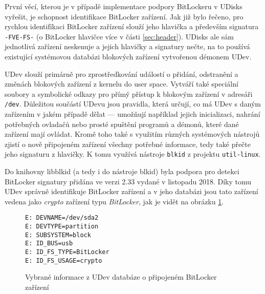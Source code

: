 \label{sec:bitlocker-identification}

První věcí, kterou je v případě implementace podpory BitLockeru v UDisks vyřešit, je schopnost identifikace BitLocker zařízení. Jak již bylo řečeno, pro rychlou identifïkaci BitLocker zařízení slouží jeho hlavička a především signatura \texttt{-FVE-FS-} (o BitLocker hlavičce více v části \ref{sec:header}). UDisks ale sám jednotlivá zařízení neskenuje a jejich hlavičky a signatury nečte, na to používá existující systémovou databázi blokových zařízení vytvořenou démonem UDev.

UDev slouží primárně pro zprostředkování událostí o přidání, odstranění a změnách blokových zařízení z kernelu do user space. Vytváří také speciální soubory a symbolické odkazy pro přímý přístup k blokovým zařízení v adresáři \texttt{/dev}. Důležitou součástí UDevu jsou pravidla, která určují, co má UDev s daným zařízením v jakém případě dělat --- umožňují například jejich inicializaci, nahrání potřebných ovladačů nebo prosté spuštění programů a démonů, které dané zařízení mají ovládat.\cite{Kenlon2018} Kromě toho také s využitím různých systémových nástrojů zjistí o nově připojeném zařízení všechny potřebné informace, tedy také přečte jeho signaturu z hlavičky. K tomu využívá nástroje \texttt{blkid} z projektu \texttt{util-linux}.

Do knihovny libblkid (a tedy i do nástroje blkid) byla podpora pro detekci BitLocker signatury přidána ve verzi 2.33 vydané v listopadu 2018\cite{Zak2018}. Díky tomu UDev správně identifikuje BitLocker zařízení a v jeho databázi jsou tato zařízení vedena jako \emph{crypto} zařízení typu \emph{BitLocker}, jak je vidět na obrázku \ref{fig:udev-bitlocker}.

\begin{figure}[h]
		\centering
		\captionsetup{width=0.65\linewidth}
\begin{center}
\centering
\begin{lstlisting}[frame=none, basicstyle=\ttfamily\small, columns=fullflexible, keepspaces=true, xleftmargin=.35\textwidth, xrightmargin=.35\textwidth]
E: DEVNAME=/dev/sda2
E: DEVTYPE=partition
E: SUBSYSTEM=block
E: ID_BUS=usb
E: ID_FS_TYPE=BitLocker
E: ID_FS_USAGE=crypto
\end{lstlisting}
\end{center}
		\caption{Vybrané informace z UDev databáze o připojeném BitLocker zařízení}
		\label{fig:udev-bitlocker}
\end{figure}

